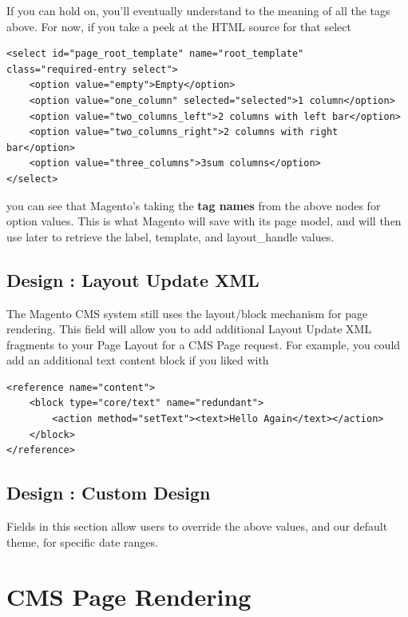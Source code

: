 \documentclass[oneside]{book}
\begin{document}
If you can hold on, you'll eventually understand to the meaning of all the tags above. For now, if you take a peek at the HTML source for that select

\begin{lstlisting}
<select id="page_root_template" name="root_template"
class="required-entry select">
    <option value="empty">Empty</option>
    <option value="one_column" selected="selected">1 column</option>
    <option value="two_columns_left">2 columns with left bar</option>
    <option value="two_columns_right">2 columns with right bar</option>
    <option value="three_columns">3sum columns</option>
</select>

\end{lstlisting}


you can see that Magento's taking the \textbf{tag names} from the above nodes for option values.  This is what Magento will save with its page model, and will then use later to retrieve the label, template, and layout\_handle values.

\subsection{Design : Layout Update XML}

The Magento CMS system still uses the layout/block mechanism for page rendering.  This field will allow you to add additional Layout Update XML fragments to your Page Layout for a CMS Page request.  For example, you could add an additional text content block if you liked with

\begin{lstlisting}
<reference name="content">
    <block type="core/text" name="redundant">
        <action method="setText"><text>Hello Again</text></action>
    </block>
</reference>

\end{lstlisting}


\subsection{Design : Custom Design}

Fields in this section allow users to override the above values, and our default theme, for specific date ranges.

\section{CMS Page Rendering}
\end{document}
